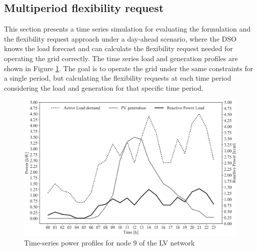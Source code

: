 \subsection{Multiperiod flexibility request}
This section presents a time series simulation for evaluating the formulation and the flexibility request approach under a day-ahead scenario, where the DSO knows the load forecast and can calculate the flexibility request needed for operating the grid correctly. The time series load and generation profiles are shown in Figure \ref{fig:data_opf_multiperiod}. The goal is to operate the grid under the same constraints for a single period, but calculating the flexibility requests at each time period considering the load and generation for that specific time period. 

%


\begin{figure}[htbp]
	\centering
	\includegraphics[width=0.8\columnwidth ]{ChapterOPF_DSO/Figures/p_q_profile_2.png}
		\caption{Time-series power profiles for node 9 of the LV network}
	\label{fig:data_opf_multiperiod}  
\end{figure}

